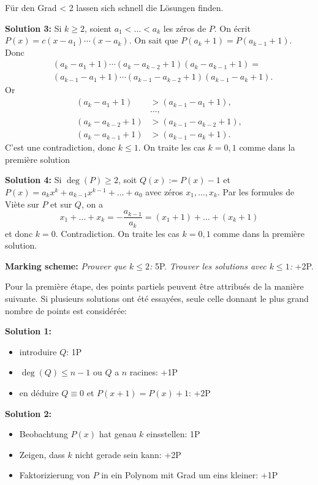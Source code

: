 \documentclass[language=german,style=solution]{smo}
\begin{document}
\begin{enumerate}
Für den Grad < 2 lassen sich schnell die Lösungen finden.

\textbf{Solution 3:}
Si $k\geq 2$, soient $a_1<\ldots<a_k$ les zéros de $P$. On écrit $P(x)=c(x-a_1)\cdots(x-a_k)$. On sait que $P(a_k+1)=P(a_{k-1}+1)$. Donc
\begin{align*}
&(a_k-a_1+1)\cdots (a_k-a_{k-2}+1)(a_k-a_{k-1}+1)=\\
&(a_{k-1}-a_1+1)\cdots (a_{k-1}-a_{k-2}+1)(a_{k-1}-a_k+1).
\end{align*}
Or 
\begin{align*}
(a_k-a_1+1)&>(a_{k-1}-a_1+1),\\
&\ldots,\\
(a_k-a_{k-2}+1)&>(a_{k-1}-a_{k-2}+1),\\
(a_k-a_{k-1}+1)&>(a_{k-1}-a_k+1).
\end{align*}
C'est une contradiction, donc $k\leq 1$. On traite les cas $k=0,1$ comme dans la première solution

\textbf{Solution 4:}
Si $\deg(P)\geq 2$, soit $Q(x):=P(x)-1$ et $P(x)=a_kx^k+a_{k-1}x^{k-1}+\ldots + a_0$ avec zéros $x_1,\ldots,x_k$. Par les formules de Viète sur $P$ et sur $Q$, on a
\[
x_1+\ldots+x_k=-\frac{a_{k-1}}{a_k}= (x_1+1)+\ldots+(x_k+1)
\]
et donc $k=0$. Contradiction. On traite les cas $k=0,1$ comme dans la première solution.

\textbf{Marking scheme:}
\textit{Prouver que $k\leq 2$:} 5P.
\textit{Trouver les solutions avec $k\leq 1$:} +2P.

Pour la première étape, des points partiels peuvent être attribués de la manière suivante. Si plusieurs solutions ont été essayées, seule celle donnant le plus grand nombre de points est considérée:

\textbf{Solution 1:}
\begin{itemize}
\item introduire $Q$: 1P
\item $\deg(Q)\leq n-1$ ou $Q$ a $n$ racines: +1P
\item en déduire $Q\equiv 0$ et $P(x+1)=P(x)+1$: +2P
\end{itemize}


\textbf{Solution 2:}
\begin{itemize}
\item Beobachtung $P(x)$ hat genau $k$ einsstellen: 1P
\item Zeigen, dass $k$ nicht gerade sein kann: +2P
\item Faktorizierung von $P$ in ein Polynom mit Grad um eins kleiner: +1P
\end{itemize}


\end{enumerate}
\end{document}
